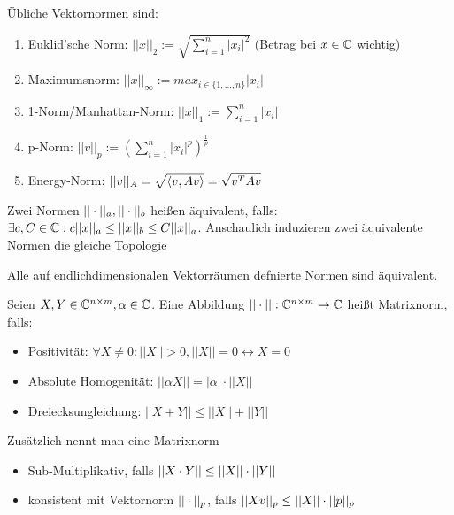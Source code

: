 \begin{definition}
	Übliche Vektornormen sind:
	\begin{enumerate}[noitemsep]
		\item Euklid'sche Norm: $||x||_2 := \sqrt{\sum_{i=1}^{n}|x_i|^2}$ (Betrag bei $x \in \mathbb{C}$ wichtig)
		\item Maximumsnorm: $||x||_\infty := max_{i \in \{1,...,n\}} |x_i|$
		\item 1-Norm/Manhattan-Norm: $||x||_1 := \sum_{i=1}^{n} |x_i|$
		\item p-Norm: $||v||_p := (\sum_{i=1}^{n} |x_i|^p)^{\frac{1}{p}}$
		\item Energy-Norm: $||v||_A = \sqrt{\langle v, Av \rangle} = \sqrt{v^TAv}$
	\end{enumerate}
\end{definition}

\begin{definition}
	Zwei Normen $||\cdot||_a, ||\cdot||_b $ heißen äquivalent, falls: $\exists c, C \in \mathbb{C} : c ||x||_a \leq ||x||_b \leq C ||x||_a$. Anschaulich induzieren zwei äquivalente Normen die gleiche Topologie
\end{definition}

\begin{satz}
	Alle auf endlichdimensionalen Vektorräumen defnierte Normen sind äquivalent.
\end{satz}

\begin{definition}[Matrixnorm]
	Seien $X, Y \in \mathbb{C}^{n \times m}, \alpha \in \mathbb{C}$. Eine Abbildung $||\cdot|| : \mathbb{C}^{n \times m} \rightarrow \mathbb{C}$ heißt Matrixnorm, falls:
	
	\begin{itemize}[noitemsep]
		\item Positivität: $\forall X \neq 0 : ||X|| > 0, ||X|| = 0 \leftrightarrow X = 0 $
		\item Absolute Homogenität: $||\alpha X|| = |\alpha| \cdot ||X||$
		\item Dreiecksungleichung: $||X + Y|| \leq ||X|| + ||Y||$
	\end{itemize}
	Zusätzlich nennt man eine Matrixnorm
	\begin{itemize}[noitemsep]
		\item Sub-Multiplikativ, falls $||X \cdot Y|| \leq ||X|| \cdot ||Y||$
		\item konsistent mit Vektornorm $||\cdot||_p$, falls $||X v||_p \leq ||X|| \cdot ||p||_p$		
	\end{itemize}
\end{definition}

